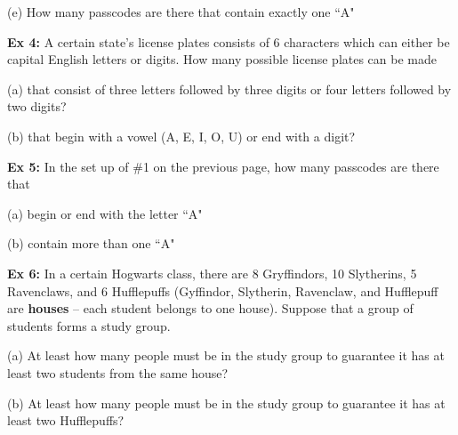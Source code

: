 \documentclass[fleqn]{article}
\theoremstyle{definition}
\begin{document}
\vspace{5.5cm} 
(e)  How many passcodes are there that contain exactly one ``A"


\vspace{4cm} 




\newpage 





\textbf{Ex 4:} A certain state's license plates consists of 6 characters which can either be capital English letters or digits. How many possible license plates can be made

\vspace{.25cm} 
(a) that consist of three letters followed by three digits or four letters followed by two digits? 

\vspace{5cm}




(b) that begin with a vowel (A, E, I, O, U) or end with a digit?



\vspace{5cm}



\textbf{Ex 5:} In the set up of \#1 on the previous page, how many passcodes are there that 

\vspace{.25cm}
(a) begin or end with the letter ``A"

\vspace{5cm}
(b) contain more than one ``A"



\newpage


\vspace{.25cm}

\textbf{Ex 6:} In a certain Hogwarts class, there are 8 Gryffindors, 10 Slytherins, 5 Ravenclaws, and 6 Hufflepuffs (Gyffindor, Slytherin, Ravenclaw, and Hufflepuff are \textbf{houses} -- each student belongs to one house). Suppose that a group of students forms a study group. 

\vspace{.25cm}
(a) At least how many people must be in the study group to guarantee it has at least two students from the same house?

\vspace{4cm}
(b) At least how many people must be in the study group to guarantee it has at least two Hufflepuffs? 

\vspace{4cm}
\end{document}
